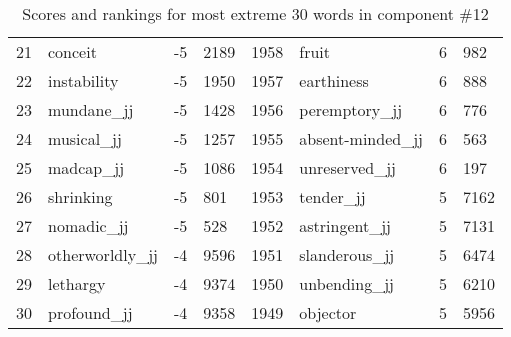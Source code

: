 \begin{table}[tbp]
\begin{tabular}{| rlr@{.}l | rlr@{.}l |}
    21 & conceit & -5 & 2189    &    1958 & fruit & 6 & 982 \\
    22 & instability & -5 & 1950    &    1957 & earthiness & 6 & 888 \\
    23 & mundane\_jj & -5 & 1428    &    1956 & peremptory\_jj & 6 & 776 \\
    24 & musical\_jj & -5 & 1257    &    1955 & absent-minded\_jj & 6 & 563 \\
    25 & madcap\_jj & -5 & 1086    &    1954 & unreserved\_jj & 6 & 197 \\
    26 & shrinking & -5 & 801    &    1953 & tender\_jj & 5 & 7162 \\
    27 & nomadic\_jj & -5 & 528    &    1952 & astringent\_jj & 5 & 7131 \\
    28 & otherworldly\_jj & -4 & 9596    &    1951 & slanderous\_jj & 5 & 6474 \\
    29 & lethargy & -4 & 9374    &    1950 & unbending\_jj & 5 & 6210 \\
    30 & profound\_jj & -4 & 9358    &    1949 & objector & 5 & 5956 \\
    \hline
    \end{tabular}
    \caption{Scores and rankings for most extreme 30 words in component \#12} 
\end{table}
\clearpage
